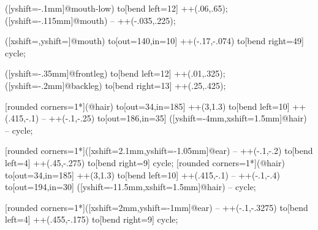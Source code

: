 { ([yshift=-.1mm]@mouth-low) to[bend left=12] ++(.06,.65);
 ([yshift=-.115mm]@mouth) -- ++(-.035,.225);

 ([xshift=\if@pingu@@horse@@donkey@ 4.5mm\fi,yshift=\if@pingu@@horse@@donkey@3.65mm\fi]@mouth) to[out=140,in=10] ++(-.17,-.074) to[bend right=49] cycle;

 ([yshift=-.35mm]@frontleg) to[bend left=12] ++(.01,.325);
 ([yshift=-.2mm]@backleg) to[bend right=13] ++(.25,.425);

\if@pingu@@horse@@donkey@
{} [rounded corners=1*\pingu@@horse@scale](@hair) to[out=34,in=185] ++(3,1.3) to[bend left=10] ++(.415,-.1) -- ++(-.1,-.25) to[out=186,in=35] ([yshift=-4mm,xshift=1.5mm]@hair) -- cycle;

 [rounded corners=1*\pingu@@horse@scale]([xshift=2.1mm,yshift=-1.05mm]@ear) -- ++(-.1,-.2) to[bend left=4] ++(.45,-.275) to[bend right=9] cycle;
\else
{} [rounded corners=1*\pingu@@horse@scale](@hair) to[out=34,in=185] ++(3,1.3) to[bend left=10] ++(.415,-.1) -- ++(-.1,-.4) to[out=194,in=30] ([yshift=-11.5mm,xshift=1.5mm]@hair) -- cycle;

 [rounded corners=1*\pingu@@horse@scale]([xshift=2mm,yshift=-1mm]@ear) -- ++(-.1,-.3275) to[bend left=4] ++(.455,-.175) to[bend right=9] cycle;
\fi

}
